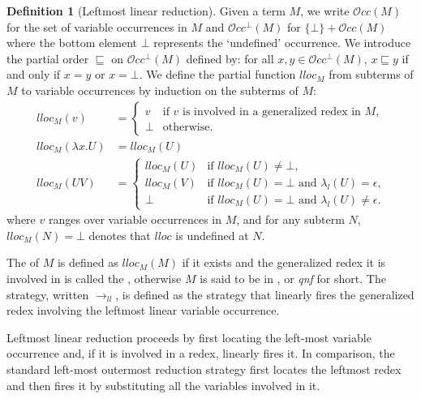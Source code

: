 \documentclass{elsarticle}
\theoremstyle{plain}
\theoremstyle{definition}
\newtheorem{definition}{Definition}[section]
\theoremstyle{remark}
\newcommand\VarOcc{\mathcal{O}{cc}}
\newcommand{\llred}{\rightarrow_{ll}}
\begin{document}
\begin{definition}[Leftmost linear reduction]
    \label{def:leftmostlinearreduction}
Given a term $M$, we write $\VarOcc(M)$ for the set of variable occurrences in $M$
and $\VarOcc^\bot(M)$ for $\{\bot \} + \VarOcc(M)$ where the bottom element $\bot$ represents the `undefined' occurrence. We introduce the partial order $\sqsubseteq$ on $\VarOcc^\bot(M)$ defined by: for all $x,y \in \VarOcc^\bot(M)$, $x \sqsubseteq y$ if and only if $x = y$ or $x = \bot$. We define the partial function $lloc_M$ from subterms of $M$ to variable occurrences by induction on the subterms of $M$:
\begin{align*}
lloc_M(v) &=
    \begin{cases}
    v &\mbox{if $v$ is involved in a generalized redex in $M$,} \\
    \bot & \mbox {otherwise.}
    \end{cases}  \\
lloc_M(\lambda x . U) &= lloc_M(U) \\
lloc_M(U V) &= \begin{cases}
                lloc_M(U) &\mbox{if $lloc_M(U)\neq\bot$,} \\
                lloc_M(V) &\mbox{if $lloc_M(U)=\bot$ and $\lambda_l(U) = \epsilon$,} \\
                \bot & \mbox{if $lloc_M(U)=\bot$ and $\lambda_l(U) \neq \epsilon$.}
              \end{cases}
\end{align*}
where $v$ ranges over variable occurrences in $M$,
and for any subterm $N$, $lloc_M(N) = \bot$ denotes that $lloc$ is undefined at $N$.

The  of $M$
is defined as $lloc_M(M)$ if it exists and the generalized redex it is involved in is called the , otherwise $M$ is said to be in , or \emph{qnf} for short.
The  strategy, written $\llred$, is defined as the strategy that linearly fires the generalized redex involving the leftmost linear variable occurrence.
\end{definition}

Leftmost linear reduction proceeds by first locating the left-most variable occurrence and, if it is involved in a redex, linearly fires it. In comparison, the standard left-most outermost reduction strategy first locates the leftmost redex and then fires it by substituting all the variables involved in it.
\end{document}
